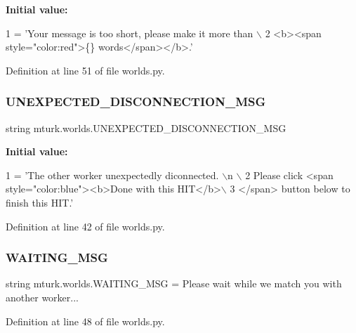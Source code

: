 {\bfseries Initial value\+:}
\begin{DoxyCode}
1 =  \textcolor{stringliteral}{'Your message is too short, please make it more than \(\backslash\)}
2 \textcolor{stringliteral}{        <b><span style="color:red">\{\} words</span></b>.'}
\end{DoxyCode}


Definition at line 51 of file worlds.\+py.

\mbox{\label{namespacemturk_1_1worlds_ac7d271d5b482f6a2f3f9c34c2f88c1b0}} 
\subsubsection{\texorpdfstring{U\+N\+E\+X\+P\+E\+C\+T\+E\+D\+\_\+\+D\+I\+S\+C\+O\+N\+N\+E\+C\+T\+I\+O\+N\+\_\+\+M\+SG}{UNEXPECTED\_DISCONNECTION\_MSG}}
{\footnotesize\ttfamily string mturk.\+worlds.\+U\+N\+E\+X\+P\+E\+C\+T\+E\+D\+\_\+\+D\+I\+S\+C\+O\+N\+N\+E\+C\+T\+I\+O\+N\+\_\+\+M\+SG}

{\bfseries Initial value\+:}
\begin{DoxyCode}
1 =  \textcolor{stringliteral}{'The other worker unexpectedly diconnected. \(\backslash\)n \(\backslash\)}
2 \textcolor{stringliteral}{        Please click <span style="color:blue"><b>Done with this HIT</b>\(\backslash\)}
3 \textcolor{stringliteral}{        </span> button below to finish this HIT.'}
\end{DoxyCode}


Definition at line 42 of file worlds.\+py.

\mbox{\label{namespacemturk_1_1worlds_a91728bfc8e1c3ae3f6934ecb293320d3}} 
\subsubsection{\texorpdfstring{W\+A\+I\+T\+I\+N\+G\+\_\+\+M\+SG}{WAITING\_MSG}}
{\footnotesize\ttfamily string mturk.\+worlds.\+W\+A\+I\+T\+I\+N\+G\+\_\+\+M\+SG = \textquotesingle{}Please wait while we match you with another worker...\textquotesingle{}}



Definition at line 48 of file worlds.\+py.

